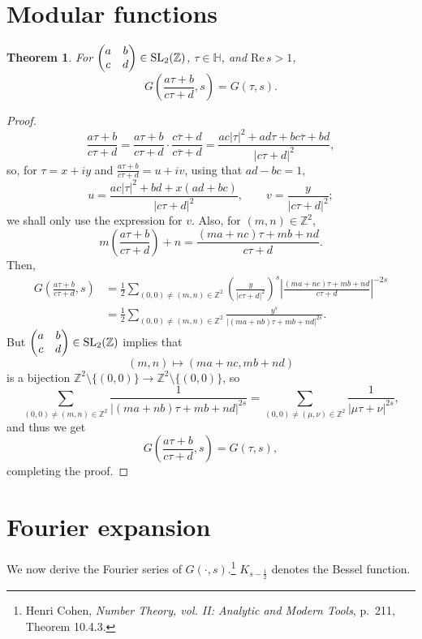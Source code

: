 \documentclass{article}
\def\Re{\ensuremath{\mathrm{Re}}\,}
\newcommand{\SL}{\ensuremath\mathrm{SL}}
\newtheorem{theorem}{Theorem}
\theoremstyle{definition}
\begin{document}
\section{Modular functions}
\begin{theorem}
For $\begin{pmatrix}a&b\\c&d\end{pmatrix} \in \SL_2(\mathbb{Z})$, $\tau \in \mathbb{H}$, and $\Re s>1$,
\[
G\left(\frac{a\tau+b}{c\tau+d},s\right) = G(\tau,s).
\]
\end{theorem}
\begin{proof}
\[
\frac{a\tau+b}{c\tau+d} = \frac{a\tau+b}{c\tau+d}
\cdot \frac{c\overline{\tau}+d}{c\overline{\tau}+d}
=\frac{ac|\tau|^2+ad\tau+bc\overline{\tau}+bd}{|c\tau+d|^2},
\]
so, for $\tau=x+iy$ and $\frac{a\tau+b}{c\tau+d} = u+iv$, using that $ad-bc=1$,
\[
u = \frac{ac|\tau|^2+bd+x(ad+bc)}{|c\tau+d|^2},
\qquad v = \frac{y}{|c\tau+d|^2};
\]
we shall only use the expression for $v$. Also, for $(m,n) \in \mathbb{Z}^2$, 
\[
m\left(\frac{a\tau+b}{c\tau+d} \right) + n = \frac{(ma+nc)\tau+mb+nd}{c\tau+d}.
\]
Then,
\begin{align*}
G\left(\frac{a\tau+b}{c\tau+d},s\right)&=\frac{1}{2}\sum_{(0,0) \neq (m,n) \in \mathbb{Z}^2} \left( \frac{y}{|c\tau+d|^2}\right)^s
 \left| \frac{(ma+nc)\tau+mb+nd}{c\tau+d} \right|^{-2s}\\
&=\frac{1}{2} \sum_{(0,0) \neq (m,n) \in \mathbb{Z}^2} \frac{y^s}{|(ma+nb)\tau+mb+nd|^{2s}}.
\end{align*}
But $\begin{pmatrix}a&b\\c&d\end{pmatrix} \in \SL_2(\mathbb{Z})$ implies that 
\[
(m,n) \mapsto (ma+nc,mb+nd)
\]
is a bijection $\mathbb{Z}^2 \setminus \{(0,0)\} \to \mathbb{Z}^2 \setminus \{(0,0)\}$, so
\[
 \sum_{(0,0) \neq (m,n) \in \mathbb{Z}^2} \frac{1}{|(ma+nb)\tau+mb+nd|^{2s}}
 = \sum_{(0,0) \neq (\mu,\nu) \in \mathbb{Z}^2} \frac{1}{|\mu\tau+\nu|^{2s}},
\]
and thus we get
\[
G\left(\frac{a\tau+b}{c\tau+d},s\right) = G(\tau,s),
\]
completing the proof.
\end{proof}







\section{Fourier expansion}
We now derive the Fourier series of $G(\cdot,s)$.\footnote{Henri Cohen, {\em Number Theory, vol. II: Analytic and Modern Tools}, p.~211, Theorem 10.4.3.}
$K_{s-\frac{1}{2}}$ denotes the Bessel function. 
\end{document}
